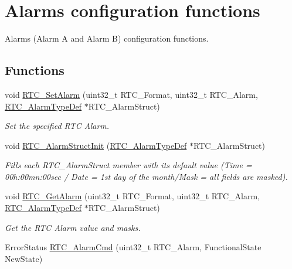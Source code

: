 \hypertarget{group___r_t_c___group3}{\section{Alarms configuration functions}
\label{group___r_t_c___group3}
}


Alarms (Alarm A and Alarm B) configuration functions.  


\subsection*{Functions}
\begin{DoxyCompactItemize}
\item 
void \hyperlink{group___r_t_c___group3_ga44e3334f8e882df9b8a59b47f0857395}{R\-T\-C\-\_\-\-Set\-Alarm} (uint32\-\_\-t R\-T\-C\-\_\-\-Format, uint32\-\_\-t R\-T\-C\-\_\-\-Alarm, \hyperlink{struct_r_t_c___alarm_type_def}{R\-T\-C\-\_\-\-Alarm\-Type\-Def} $\ast$R\-T\-C\-\_\-\-Alarm\-Struct)
\begin{DoxyCompactList}\small\item\em Set the specified R\-T\-C Alarm. \end{DoxyCompactList}\item 
void \hyperlink{group___r_t_c___group3_ga36ab6199e21fb415ab1ec4d7aa48ba45}{R\-T\-C\-\_\-\-Alarm\-Struct\-Init} (\hyperlink{struct_r_t_c___alarm_type_def}{R\-T\-C\-\_\-\-Alarm\-Type\-Def} $\ast$R\-T\-C\-\_\-\-Alarm\-Struct)
\begin{DoxyCompactList}\small\item\em Fills each R\-T\-C\-\_\-\-Alarm\-Struct member with its default value (Time = 00h\-:00mn\-:00sec / Date = 1st day of the month/\-Mask = all fields are masked). \end{DoxyCompactList}\item 
void \hyperlink{group___r_t_c___group3_ga6e2888d2fd2e3ecb4ec50f5c955b362b}{R\-T\-C\-\_\-\-Get\-Alarm} (uint32\-\_\-t R\-T\-C\-\_\-\-Format, uint32\-\_\-t R\-T\-C\-\_\-\-Alarm, \hyperlink{struct_r_t_c___alarm_type_def}{R\-T\-C\-\_\-\-Alarm\-Type\-Def} $\ast$R\-T\-C\-\_\-\-Alarm\-Struct)
\begin{DoxyCompactList}\small\item\em Get the R\-T\-C Alarm value and masks. \end{DoxyCompactList}\item 
Error\-Status \hyperlink{group___r_t_c___group3_gac2c08f1aeeb664d3d245cb5aca1b8ca8}{R\-T\-C\-\_\-\-Alarm\-Cmd} (uint32\-\_\-t R\-T\-C\-\_\-\-Alarm, Functional\-State New\-State)

\end{DoxyCompactItemize}
